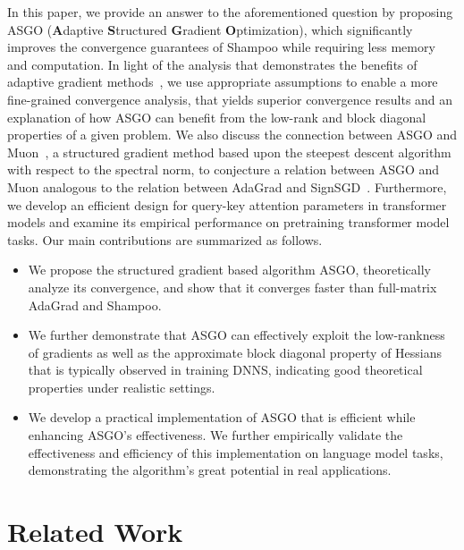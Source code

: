 \documentclass{article}
\theoremstyle{remark}
\begin{document}
In this paper, we provide an answer to the aforementioned question by proposing ASGO (\textbf{A}daptive \textbf{S}tructured \textbf{G}radient \textbf{O}ptimization), which significantly improves the convergence guarantees of Shampoo while requiring less memory and computation. In light of the analysis that demonstrates the benefits of adaptive gradient methods~\citep{duchi2011adaptive,liu2024adagrad,jiang2024convergence,xie2020linear}, we use appropriate assumptions to enable a more fine-grained convergence analysis, that yields superior convergence results and an explanation of how ASGO can benefit from the low-rank and block diagonal properties of
a given
problem. {We also discuss the connection between ASGO and Muon~\citep{jordan2024muon}, a structured gradient method based upon the steepest descent algorithm with
respect  to the spectral norm, to conjecture a relation between ASGO and Muon analogous to the relation between AdaGrad and SignSGD~\citep{bernstein2018signsgd,kunstner2023noise}.} Furthermore, we develop an efficient design for query-key attention parameters in transformer models and examine 
its
empirical performance on pretraining transformer model tasks. Our main contributions are summarized as follows.
\begin{itemize}[leftmargin=*]
    \item We propose the structured gradient based algorithm ASGO, theoretically analyze its convergence, and show that it converges faster than full-matrix AdaGrad and Shampoo.
    \item We further demonstrate that ASGO can effectively exploit the low-rankness of gradients as well as the approximate block diagonal property of Hessians that is typically observed in training DNNS, indicating good theoretical properties under realistic settings.
    \item We develop a practical implementation of ASGO that is efficient while enhancing ASGO's effectiveness. We further empirically validate the effectiveness and efficiency of this implementation on language model tasks, demonstrating the algorithm's great potential in real applications. 
\end{itemize}

\section{Related Work}\label{sec:related_work}
\end{document}
